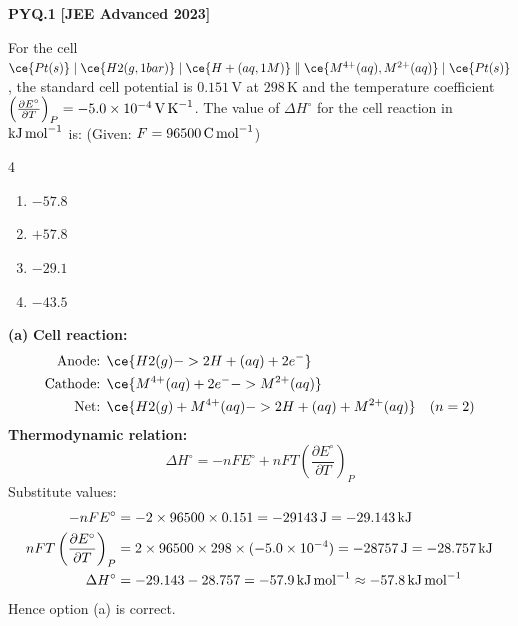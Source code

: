 \begin{problembox}
\textbf{PYQ.1} \hfill \textbf{[JEE Advanced 2023]}

For the cell $\ce{Pt(s)} \mid \ce{H2(g, 1 bar)} \mid \ce{H+(aq, 1 M)} \parallel \ce{M^{4+}(aq), M^{2+}(aq)} \mid \ce{Pt(s)}$, the standard cell potential is $0.151\,\text{V}$ at $298\,\text{K}$ and the temperature coefficient $\left(\frac{\partial E^\circ}{\partial T}\right)_P = -5.0 \times 10^{-4}\,\text{V\,K}^{-1}$. The value of $\Delta H^\circ$ for the cell reaction in $\text{kJ\,mol}^{-1}$ is: (Given: $F = 96500\,\text{C\,mol}^{-1}$)
\begin{multicols}{4}
\begin{enumerate}[label=(\alph*)]
    \item $-57.8$
    \item $+57.8$
    \item $-29.1$
    \item $-43.5$
\end{enumerate}
\end{multicols}
\end{problembox}
\begin{solution}
\textbf{(a)}
\textbf{Cell reaction:}
\begin{align*}
    \text{Anode: } & \ce{H2(g) -> 2H+(aq) + 2e^-} \\
    \text{Cathode: } & \ce{M^{4+}(aq) + 2e^- -> M^{2+}(aq)} \\
    \text{Net: } & \ce{H2(g) + M^{4+}(aq) -> 2H+(aq) + M^{2+}(aq)} \quad (n = 2)
\end{align*}
\textbf{Thermodynamic relation:}
\begin{equation*}
    \Delta H^\circ = -nFE^\circ + nFT\left(\frac{\partial E^\circ}{\partial T}\right)_P
\end{equation*}
Substitute values:
\begin{align*}
    -nFE^\circ &= -2 \times 96500 \times 0.151 = -29143\,\text{J} = -29.143\,\text{kJ} \\
    nFT\left(\frac{\partial E^\circ}{\partial T}\right)_P &= 2 \times 96500 \times 298 \times (-5.0 \times 10^{-4}) = -28757\,\text{J} = -28.757\,\text{kJ} \\
    \Delta H^\circ &= -29.143 - 28.757 = -57.9\,\text{kJ\,mol}^{-1} \approx -57.8\,\text{kJ\,mol}^{-1}
\end{align*}
Hence option (a) is correct.
\end{solution}


